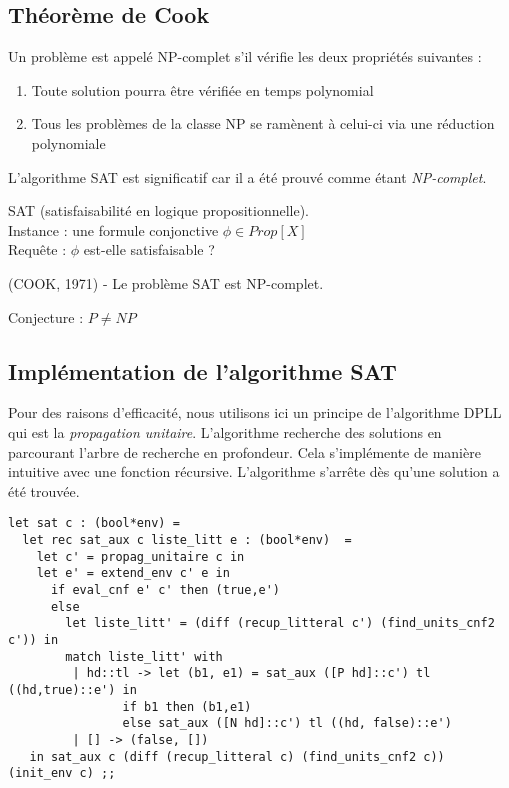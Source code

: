 \subsection{Théorème de Cook}
\begin{definition}
	Un problème est appelé NP-complet s'il vérifie les deux propriétés suivantes :
	\begin{enumerate}
		\item Toute solution pourra être vérifiée en temps polynomial
		\item Tous les problèmes de la classe NP se ramènent à celui-ci via une réduction polynomiale 
	\end{enumerate}
\end{definition}
L'algorithme SAT est significatif car il a été prouvé comme étant \textit{NP-complet}.
\begin{definition}
	SAT (satisfaisabilité en logique propositionnelle). \\
	Instance : une formule conjonctive $\phi \in Prop[X] $ \\
	Requête : $\phi$ est-elle satisfaisable ? 
\end{definition}
\begin{theoreme}
	(COOK, 1971) - Le problème SAT est NP-complet.
\end{theoreme}
\begin{theoreme}
Conjecture : $P\neq NP$
\end{theoreme}

\subsection{Implémentation de l'algorithme SAT}
Pour des raisons d'efficacité, nous utilisons ici un principe de l'algorithme DPLL qui est la \textit{propagation unitaire}.
L'algorithme recherche des solutions en parcourant l'arbre de recherche en profondeur. Cela s'implémente de manière
intuitive avec une fonction récursive. L'algorithme s'arrête dès qu'une solution a été trouvée.

\begin{Verbatim}
let sat c : (bool*env) =
  let rec sat_aux c liste_litt e : (bool*env)  = 
    let c' = propag_unitaire c in
    let e' = extend_env c' e in
      if eval_cnf e' c' then (true,e') 
      else 
        let liste_litt' = (diff (recup_litteral c') (find_units_cnf2 c')) in
        match liste_litt' with 
         | hd::tl -> let (b1, e1) = sat_aux ([P hd]::c') tl ((hd,true)::e') in
                if b1 then (b1,e1) 
                else sat_aux ([N hd]::c') tl ((hd, false)::e')
         | [] -> (false, [])
   in sat_aux c (diff (recup_litteral c) (find_units_cnf2 c)) (init_env c) ;;
\end{Verbatim}

